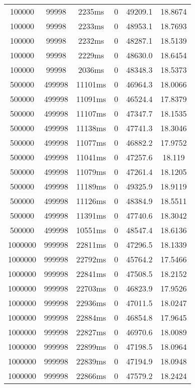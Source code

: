 \documentclass[./main.tex]{subfiles}
\begin{document}
\begin{table}
\begin{tabular}{ c | c | c | c | c | c }
        \rowcolor{lightgray} 100000 & 99998 & 2235ms & 0 & 49209.1 & 18.8674 \\
        100000 & 99998 & 2233ms & 0 & 48953.1 & 18.7693 \\
        100000 & 99998 & 2232ms & 0 & 48287.1 & 18.5139 \\
        100000 & 99998 & 2229ms & 0 & 48630.0 & 18.6454 \\
        100000 & 99998 & 2036ms & 0 & 48348.3 & 18.5373 \\
        \hline
        500000 & 499998 & 11101ms & 0 & 46964.3 & 18.0066 \\
        500000 & 499998 & 11091ms & 0 & 46524.4 & 17.8379 \\
        \rowcolor{lightgray} 500000 & 499998 & 11107ms & 0 & 47347.7 & 18.1535 \\
        500000 & 499998 & 11138ms & 0 & 47741.3 & 18.3046 \\
        500000 & 499998 & 11077ms & 0 & 46882.2 & 17.9752 \\
        500000 & 499998 & 11041ms & 0 & 47257.6 & 18.119 \\
        500000 & 499998 & 11079ms & 0 & 47261.4 & 18.1205 \\
        500000 & 499998 & 11189ms & 0 & 49325.9 & 18.9119 \\
        500000 & 499998 & 11126ms & 0 & 48384.9 & 18.5511 \\
        500000 & 499998 & 11391ms & 0 & 47740.6 & 18.3042 \\
        500000 & 499998 & 10551ms & 0 & 48547.4 & 18.6136 \\
        \hline
        1000000 & 999998 & 22811ms & 0 & 47296.5 & 18.1339 \\
        1000000 & 999998 & 22792ms & 0 & 45764.2 & 17.5466 \\
        1000000 & 999998 & 22841ms & 0 & 47508.5 & 18.2152 \\
        1000000 & 999998 & 22703ms & 0 & 46823.9 & 17.9526 \\
        1000000 & 999998 & 22936ms & 0 & 47011.5 & 18.0247 \\
        1000000 & 999998 & 22884ms & 0 & 46854.8 & 17.9645 \\
        1000000 & 999998 & 22827ms & 0 & 46970.6 & 18.0089 \\
        1000000 & 999998 & 22899ms & 0 & 47198.5 & 18.0964 \\
        1000000 & 999998 & 22839ms & 0 & 47194.9 & 18.0948 \\
        1000000 & 999998 & 22866ms & 0 & 47579.2 & 18.2424 \\

\end{tabular}
\end{table}
\end{document}
